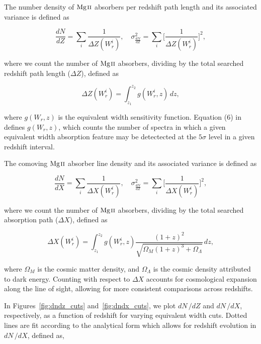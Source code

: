 \documentclass[iop,apj,numberedappendix,appendixfloats,twocolappendix]{emulateapj}
\begin{document}
The number density of ${\hbox{{\rm Mg}\kern 0.1em{\sc ii}}}$ absorbers per redshift path length and its associated variance is defined as

\begin{equation}
\frac{d N}{d Z} = \sum_{i}\frac{1}{\Delta Z(W_r^i)},\quad \sigma^2_{\frac{d N}{d Z}} = \sum_{i} \Big[\frac{1}{\Delta Z(W_r^i)}\Big]^2,
\label{eqn:dndz}
\end{equation}

where we count the number of ${\hbox{{\rm Mg}\kern 0.1em{\sc ii}}}$ absorbers, dividing by the total searched redshift path length ($\Delta Z$), defined as

\begin{equation}
\Delta Z(W_r^i) = \int_{z_1}^{z_2} g(W_r^i, z)\,dz,
\label{eqn:deltaz}
\end{equation}

where $g(W_r, z)$ is the equivalent width sensitivity function. Equation (6) in \cite{Lanzetta1987} defines $g(W_r, z)$, which counts the number of spectra in which a given equivalent width absorption feature may be detectected at the $5\sigma$ level in a given redshift interval. 

The comoving ${\hbox{{\rm Mg}\kern 0.1em{\sc ii}}}$ absorber line density and its associated variance is defined as

\begin{equation}
\frac{d N}{d X} = \sum_{i}\frac{1}{\Delta X(W_r^i)},\quad \sigma^2_{\frac{d N}{d Z}} = \sum_{i} \Big[\frac{1}{\Delta X(W_r^i)}\Big]^2,
\label{eqn:dndx}
\end{equation}

where we count the number of ${\hbox{{\rm Mg}\kern 0.1em{\sc ii}}}$ absorbers, dividing by the total searched absorption path ($\Delta X$), defined as

\begin{equation}
\Delta X(W_r^i) = \int_{z_1}^{z_2} g(W_r^i, z) \frac{(1 + z)^2}{\sqrt{\Omega_M (1 + z)^3 + \Omega_{\Lambda}}}\,dz,
\label{eqn:deltax}
\end{equation}

where $\Omega_M$ is the cosmic matter density, and $\Omega_{\Lambda}$ is the cosmic density attributed to dark energy. Counting with respect to $\Delta X$ accounts for cosmological expansion along the line of sight, allowing for more consistent comparisons across redshifts. 

In Figures~\ref{fig:dndz_cuts} and~\ref{fig:dndx_cuts}, we plot $dN\,/dZ$ and $dN\,/dX$, respectively, as a function of redshift for varying equivalent width cuts. Dotted lines are fit according to the analytical form which allows for redshift evolution in $dN\,/dX$, defined as,
\end{document}
